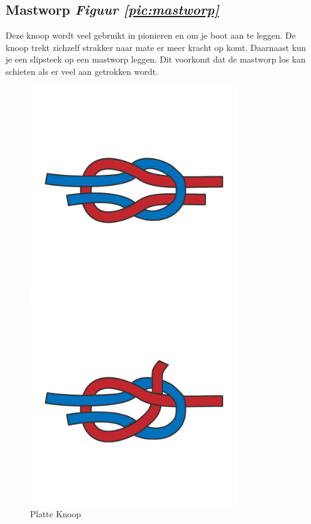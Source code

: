 \subsection{Mastworp \hfill \textit{Figuur \ref{pic:mastworp}}}
Deze knoop wordt veel gebruikt in pionieren en om je boot aan te leggen. De knoop trekt zichzelf strakker naar mate er meer kracht op komt. Daarnaast kun je een slipsteek op een mastworp leggen. Dit voorkomt dat de mastworp los kan schieten als er veel aan getrokken wordt. 
\begin{figure}[h]
  \centering
  \begin{minipage}[b]{0.32\textwidth}
  \centering
    \includegraphics[width=0.8\textwidth]{Hoofdstukken/Schiemannen/pdf/platteknoop.pdf}
    \caption{Platte Knoop}
    \label{pic:platte_knoop}
  \end{minipage}
  \hfill
  \begin{minipage}[b]{0.32\textwidth}
    \centering
    \includegraphics[width=0.8\textwidth]{Hoofdstukken/Schiemannen/pdf/schootsteek.pdf}

\end{minipage}
\end{figure}
